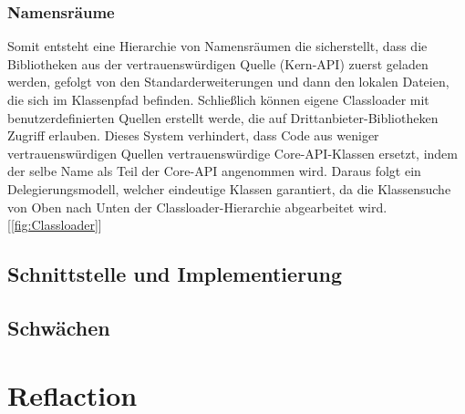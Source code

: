 \subsubsection{Namensräume}
Somit entsteht eine Hierarchie von Namensräumen die sicherstellt, dass die Bibliotheken aus der vertrauenswürdigen Quelle (Kern-API) zuerst geladen werden, gefolgt von den Standarderweiterungen und dann den lokalen Dateien, die sich im Klassenpfad befinden. Schließlich können eigene Classloader mit benutzerdefinierten Quellen erstellt werde, die auf Drittanbieter-Bibliotheken Zugriff erlauben.
Dieses System verhindert, dass Code aus weniger vertrauenswürdigen Quellen vertrauenswürdige Core-API-Klassen ersetzt, indem der selbe Name als Teil der Core-API angenommen wird. Daraus folgt ein Delegierungsmodell, welcher eindeutige Klassen garantiert, da die Klassensuche von Oben nach Unten der Classloader-Hierarchie abgearbeitet wird. [\ref{fig:Classloader}]








\subsection{Schnittstelle und Implementierung} %
\label{sub:Schnittstelle und Implementierung}

\subsection{Schwächen} %
\label{sub:schwächen}

\section{Reflaction} 
\label{sec:reflaction}

